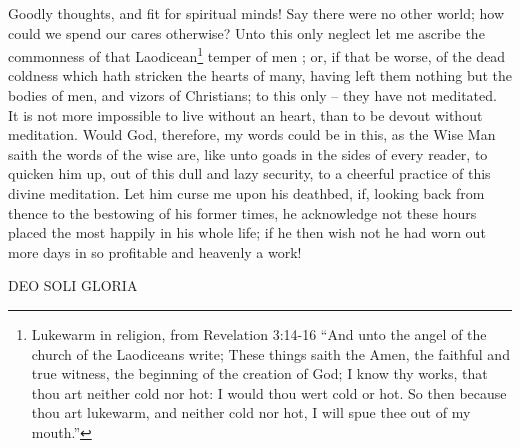 Goodly thoughts, and fit for spiritual minds! Say there were no other world; how could we spend our cares otherwise? Unto this only neglect let me ascribe the commonness of that Laodicean\footnote{Lukewarm in religion, from Revelation 3:14-16 ``And unto the angel of the church of the Laodiceans write; These things saith the Amen, the faithful and true witness, the beginning of the creation of God; I know thy works, that thou art neither cold nor hot: I would thou wert cold or hot. So then because thou art lukewarm, and neither cold nor hot, I will spue thee out of my mouth.''} temper of men ; or, if that be worse, of the dead coldness which hath stricken the hearts of many, having left them nothing but the bodies of men, and vizors of Christians; to this only -- they have not meditated. It is not more impossible to live without an heart, than to be devout without meditation. Would God, therefore, my words could be in this, as the Wise Man saith the words of the wise are, like unto goads in the sides of every reader, to quicken him up, out of this dull and lazy security, to a cheerful practice of this divine meditation. Let him curse me upon his deathbed, if, looking back from thence to the bestowing of his former times, he acknowledge not these hours placed the most happily in his whole life; if he then wish not he had worn out more days in so profitable and heavenly a work! 

\begin{center}
DEO SOLI GLORIA 
\end{center}